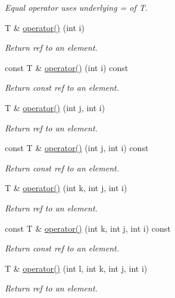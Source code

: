 \begin{DoxyCompactItemize}
\begin{DoxyCompactList}\small\item\em Equal operator uses underlying = of T. \end{DoxyCompactList}\item 
T \& \mbox{\hyperlink{classADAT_1_1ArrayNd_a927bb95e9323c4f74e0721ee867bcb64}{operator()}} (int i)
\begin{DoxyCompactList}\small\item\em Return ref to an element. \end{DoxyCompactList}\item 
const T \& \mbox{\hyperlink{classADAT_1_1ArrayNd_a0b16b5d4f7eed2684623a9c1dbcfeebe}{operator()}} (int i) const
\begin{DoxyCompactList}\small\item\em Return const ref to an element. \end{DoxyCompactList}\item 
T \& \mbox{\hyperlink{classADAT_1_1ArrayNd_a935f9f5199e47612b81056ac7b654c24}{operator()}} (int j, int i)
\begin{DoxyCompactList}\small\item\em Return ref to an element. \end{DoxyCompactList}\item 
const T \& \mbox{\hyperlink{classADAT_1_1ArrayNd_a476aa275f16078c90cb745312f344194}{operator()}} (int j, int i) const
\begin{DoxyCompactList}\small\item\em Return const ref to an element. \end{DoxyCompactList}\item 
T \& \mbox{\hyperlink{classADAT_1_1ArrayNd_a8c15c0d70203e59f5f746350eb6262a9}{operator()}} (int k, int j, int i)
\begin{DoxyCompactList}\small\item\em Return ref to an element. \end{DoxyCompactList}\item 
const T \& \mbox{\hyperlink{classADAT_1_1ArrayNd_a1452ab01ffb2824ebcfa50ebbcdd7b8a}{operator()}} (int k, int j, int i) const
\begin{DoxyCompactList}\small\item\em Return const ref to an element. \end{DoxyCompactList}\item 
T \& \mbox{\hyperlink{classADAT_1_1ArrayNd_a0d3dfd90a9e68964948dbccb48b18f1d}{operator()}} (int l, int k, int j, int i)
\begin{DoxyCompactList}\small\item\em Return ref to an element. \end{DoxyCompactList}\item 

\end{DoxyCompactItemize}
